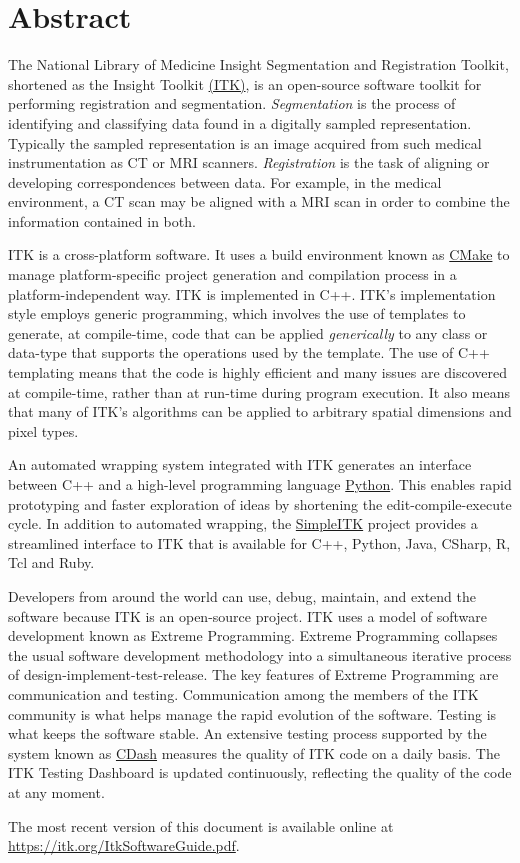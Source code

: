 \chapter*{Abstract}
\noindent
The National Library of Medicine Insight Segmentation and Registration Toolkit,
shortened as the Insight Toolkit \href{https://itk.org}{(ITK)}, is an
open-source software toolkit for performing registration and
segmentation. \emph{Segmentation} is the process of identifying and
classifying data found in a digitally sampled
representation. Typically the sampled representation is an image
acquired from such medical instrumentation as CT or MRI
scanners. \emph{Registration} is the task of aligning or developing
correspondences between data. For example, in the medical environment,
a CT scan may be aligned with a MRI scan in order to combine the
information contained in both.

ITK is a cross-platform software. It uses a build environment known as
\href{https://cmake.org}{CMake} to manage platform-specific project
generation and compilation process in a platform-independent way. ITK is
implemented in C++. ITK's implementation style employs generic programming,
which involves the use of templates to generate, at compile-time, code that can
be applied \emph{generically} to any class or data-type that supports the
operations used by the template. The use of C++ templating means that the code
is highly efficient and many issues are discovered at compile-time, rather than
at run-time during program execution. It also means that many of ITK's
algorithms can be applied to arbitrary spatial dimensions and pixel types.

An automated wrapping system integrated with ITK generates an interface between
C++ and a high-level programming language \href{https://www.python.org}{Python}.
This enables rapid prototyping and faster exploration of ideas by shortening the
edit-compile-execute cycle. In addition to automated
wrapping, the \href{https://www.itk.org/Wiki/SimpleITK}{SimpleITK} project
provides a streamlined interface to ITK that is available for C++, Python, Java,
CSharp, R, Tcl and Ruby.

Developers from around the world can use, debug, maintain, and extend the
software because ITK is an open-source project. ITK uses a
model of software development known as Extreme
Programming. Extreme Programming collapses the usual software development
methodology into a simultaneous iterative process of
design-implement-test-release. The key features of Extreme Programming
are communication and testing. Communication among the members of the
ITK community is what helps manage the rapid evolution of the
software. Testing is what keeps the software stable. An
extensive testing process supported by the system known as
\href{https://open.cdash.org/index.php?project=Insight}{CDash}
measures the quality of ITK code on a daily basis. The ITK Testing Dashboard is
updated continuously, reflecting the quality of the code at any moment.

The most recent version of this document is available online at
\url{https://itk.org/ItkSoftwareGuide.pdf}.
